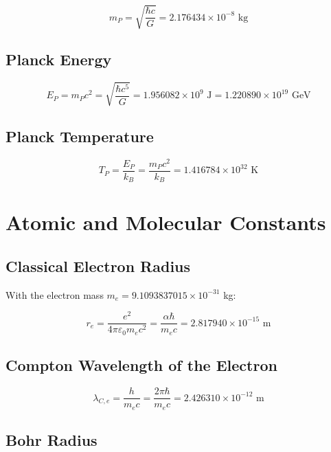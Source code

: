 	\begin{equation}
		m_P = \sqrt{\frac{\hbar c}{G}} = 2.176434 \times 10^{-8} \text{ kg}
	\end{equation}
	
	\subsection{Planck Energy}
	
	\begin{equation}
		E_P = m_P c^2 = \sqrt{\frac{\hbar c^5}{G}} = 1.956082 \times 10^9 \text{ J} = 1.220890 \times 10^{19} \text{ GeV}
	\end{equation}
	
	\subsection{Planck Temperature}
	
	\begin{equation}
		T_P = \frac{E_P}{k_B} = \frac{m_P c^2}{k_B} = 1.416784 \times 10^{32} \text{ K}
	\end{equation}
	
	\section{Atomic and Molecular Constants}
	
	\subsection{Classical Electron Radius}
	
	With the electron mass $m_e = 9.1093837015 \times 10^{-31}$ kg:
	
	\begin{equation}
		r_e = \frac{e^2}{4\pi\varepsilon_0 m_e c^2} = \frac{\alpha \hbar}{m_e c} = 2.817940 \times 10^{-15} \text{ m}
	\end{equation}
	
	\subsection{Compton Wavelength of the Electron}
	
	\begin{equation}
		\lambda_{C,e} = \frac{h}{m_e c} = \frac{2\pi\hbar}{m_e c} = 2.426310 \times 10^{-12} \text{ m}
	\end{equation}
	
	\subsection{Bohr Radius}
	
